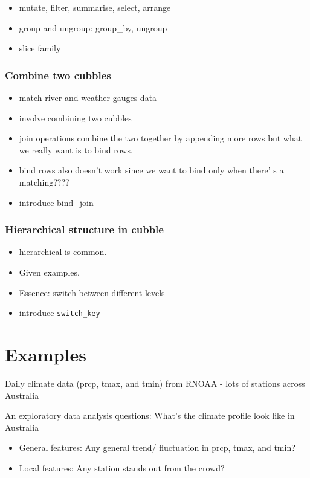 \documentclass[
]{jss}
\providecommand{\tightlist}{%
  \setlength{\itemsep}{0pt}\setlength{\parskip}{0pt}}
\begin{document}
\begin{itemize}
\tightlist
\item
  mutate, filter, summarise, select, arrange
\item
  group and ungroup: group\_by, ungroup
\item
  slice family
\end{itemize}

\hypertarget{combine-two-cubbles}{%
\subsubsection{Combine two cubbles}\label{combine-two-cubbles}}

\begin{itemize}
\tightlist
\item
  match river and weather gauges data
\item
  involve combining two cubbles
\item
  join operations combine the two together by appending more rows but
  what we really want is to bind rows.
\item
  bind rows also doesn't work since we want to bind only when there' s a
  matching????
\item
  introduce bind\_join
\end{itemize}

\hypertarget{hierarchical-structure-in-cubble}{%
\subsubsection{Hierarchical structure in
cubble}\label{hierarchical-structure-in-cubble}}

\begin{itemize}
\tightlist
\item
  hierarchical is common.
\item
  Given examples.
\item
  Essence: switch between different levels
\item
  introduce \texttt{switch\_key}
\end{itemize}

\hypertarget{examples-1}{%
\section{Examples}\label{examples-1}}

Daily climate data (prcp, tmax, and tmin) from RNOAA - lots of stations
across Australia

An exploratory data analysis questions: What's the climate profile look
like in Australia

\begin{itemize}
\tightlist
\item
  General features: Any general trend/ fluctuation in prcp, tmax, and
  tmin?
\item
  Local features: Any station stands out from the crowd?
\end{itemize}


\end{document}
